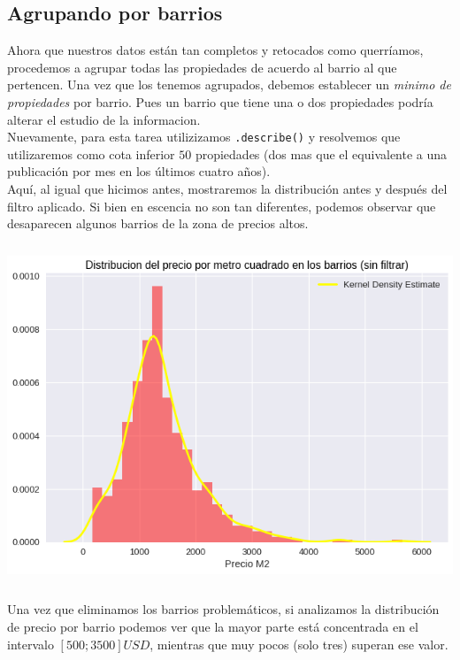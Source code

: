 \documentclass[a4paper, 10pt]{article}
\def\code#1{\texttt{#1}}
\newcommand\tab[1][0.5cm]{\hspace*{#1}}
\begin{document}
			\subsection{Agrupando por barrios}
				Ahora que nuestros datos están tan completos y retocados como querríamos, procedemos a agrupar todas las propiedades
				de acuerdo al barrio al que pertencen. Una vez que los tenemos agrupados, debemos establecer un \emph{minimo de
				propiedades} por barrio. Pues un barrio que tiene una o dos propiedades podría alterar el estudio de la
				informacion. \\
				\tab Nuevamente, para esta tarea utilizizamos \code{.describe()} y resolvemos que utilizaremos como cota inferior
				$50$ propiedades (dos mas que el equivalente a una publicación por mes en los últimos cuatro años). \\
				\tab Aquí, al igual que hicimos antes, mostraremos la distribución antes y después del filtro aplicado. Si bien
				en escencia no son tan diferentes, podemos observar que desaparecen algunos barrios de la zona de precios altos.
				\begin{center}
       				\includegraphics[width=6in, height=4in]{images/m2HoodUnfilteredKDE}
		   		\end{center}
				\tab Una vez que eliminamos los barrios problemáticos, si analizamos la distribución de precio por barrio
				podemos ver que la mayor parte está concentrada en el intervalo $[500;3500]USD$, mientras que muy pocos
				(solo tres) superan ese valor.
\end{document}
